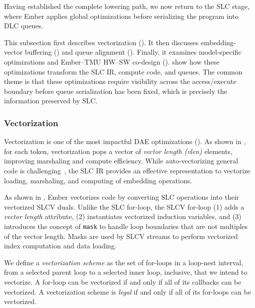 Having established the complete lowering path, we now return to the SLC stage, where Ember applies global optimizations before serializing the program into DLC queues.





This subsection first describes vectorization (). It then discusses embedding-vector buffering () and queue alignment (). Finally, it examines model-specific optimizations and Ember--TMU HW--SW co-design ().  show how these optimizations transform the SLC IR, compute code, and queues. The common theme is that these optimizations require visibility across the access/execute boundary before queue serialization has been fixed, which is precisely the information preserved by SLC.

\subsubsection{Vectorization} \label{sec:vectorization-ember} %

Vectorization is one of the most impactful DAE optimizations (). As shown in , for each token, vectorization pops a vector of \textit{vector length (vlen)} elements, improving marshaling and compute efficiency. While auto-vectorizing general code is challenging~\cite{smith1991sc,kennedy2001book}, the SLC IR provides an effective representation to vectorize loading, marshaling, and computing of embedding operations.

As shown in , Ember vectorizes code by converting SLC operations into their vectorized SLCV duals. Unlike the SLC for-loop, the SLCV for-loop (1) adds a \emph{vector length} attribute, (2) instantiates vectorized induction variables, and (3) introduces the concept of \texttt{mask} to handle loop boundaries that are not multiples of the vector length. Masks are used by SLCV streams to perform vectorized index computation and data loading.

We define a \emph{vectorization scheme} as the set of for-loops in a loop-nest interval, from a selected parent loop to a selected inner loop, inclusive, that we intend to vectorize. A for-loop can be vectorized if and only if all of its callbacks can be vectorized. A vectorization scheme is \emph{legal} if and only if all of its for-loops can be vectorized.

